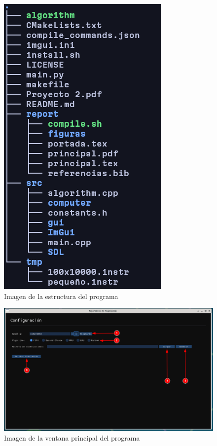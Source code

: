 \documentclass{report}
\begin{document}
\begin{figure}[h]
	\centering
	\includegraphics[width=0.8\linewidth]{figuras/estructura.png}
	\caption{Imagen de la estructura del programa }
	\label{fig:estructura}
\end{figure}

\begin{figure}[h]
	\centering
	\includegraphics[width=0.99\linewidth]{figuras/guide/setup_window.png}
	\caption{Imagen de la ventana principal del programa}
	\label{fig:setup}
\end{figure}
\end{document}
